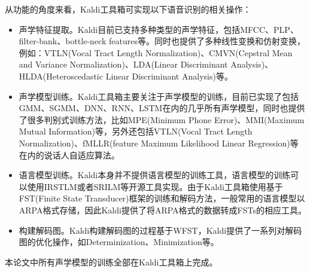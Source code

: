 从功能的角度来看，Kaldi工具箱可实现以下语音识别的相关操作：
\begin{itemize}
  \item 声学特征提取。Kaldi目前已支持多种类型的声学特征，包括MFCC、PLP、filter-bank、bottle-neck features等。同时也提供了多种线性变换和仿射变换，例如：VTLN(Vocal Tract Length Normalization)、CMVN(Cepstral Mean and Variance Normalization)、LDA(Linear Discriminant Analysis)、HLDA(Heteroscedastic Linear Discriminant Analysis)等。
  \item 声学模型训练。Kaldi工具箱主要关注于声学模型的训练，目前已实现了包括GMM、SGMM、DNN、RNN、LSTM在内的几乎所有声学模型，同时也提供了很多判别式训练方法，比如MPE(Minimum Phone Error)、MMI(Maximum Mutual Information)等，另外还包括VTLN(Vocal Tract Length Normalization)、fMLLR(feature Maximum Likelihood Linear Regression)等在内的说话人自适应算法。
  \item 语言模型训练。Kaldi本身并不提供语言模型的训练工具，语言模型的训练可以使用IRSTLM或者SRILM等开源工具实现。由于Kaldi工具箱使用基于FST(Finite State Transducer)框架的训练和解码方法，一般常用的语言模型以ARPA格式存储，因此Kaldi提供了将ARPA格式的数据转成FSTs的相应工具。
  \item 构建解码图。Kaldi构建解码图的过程基于WFST\cite{mohri2002weighted}，Kaldi提供了一系列对解码图的优化操作，如Determinization、Minimization等。
\end{itemize}

本论文中所有声学模型的训练全部在Kaldi工具箱上完成。
